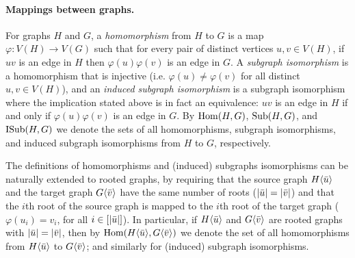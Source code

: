 

\paragraph*{Mappings between graphs.} For graphs $H$ and $G$, a \emph{homomorphism} from $H$ to $G$ is a map $\varphi\colon V(H)\to V(G)$ such that for every pair of distinct vertices $u,v\in V(H)$, if $uv$ is an edge in $H$ then $\varphi(u)\varphi(v)$ is an edge in $G$. A \emph{subgraph isomorphism} is a homomorphism that is injective (i.e. $\varphi(u)\neq \varphi(v)$ for all distinct $u,v\in V(H)$), and an \emph{induced subgraph isomorphism} is a subgraph isomorphism where the implication stated above is in fact an equivalence: $uv$ is an edge in $H$ if and only if $\varphi(u)\varphi(v)$ is an edge in $G$. By $\mathrm{Hom}(H,G)$, $\mathrm{Sub}(H,G)$, and $\mathrm{ISub}(H,G)$ we denote the sets of all homomorphisms, subgraph isomorphisms, and induced subgraph isomorphisms from $H$ to $G$, respectively.

The definitions of homomorphisms and (induced) subgraphs isomorphisms can be naturally extended to rooted graphs, by requiring that the source graph $H\langle {\bar{u}}\rangle$ and the target graph $G\langle {\bar{v}}\rangle$ have the same number of roots ($|{\bar{u}}|=|{\bar{v}}|$) and that the $i$th root of the source graph is mapped to the $i$th root of the target graph ($\varphi(u_i)=v_i$, for all $i\in [|{\bar{u}}|]$). In particular, if $H\langle {\bar{u}}\rangle$ and $G\langle {\bar{v}}\rangle$ are rooted graphs with $|{\bar{u}}|=|{\bar{v}}|$, then by $\mathrm{Hom}(H\langle {\bar{u}}\rangle,G\langle {\bar{v}}\rangle)$ we denote the set of all homomorphisms from $H\langle {\bar{u}}\rangle$ to $G\langle {\bar{v}}\rangle$; and similarly for (induced) subgraph isomorphisms.




